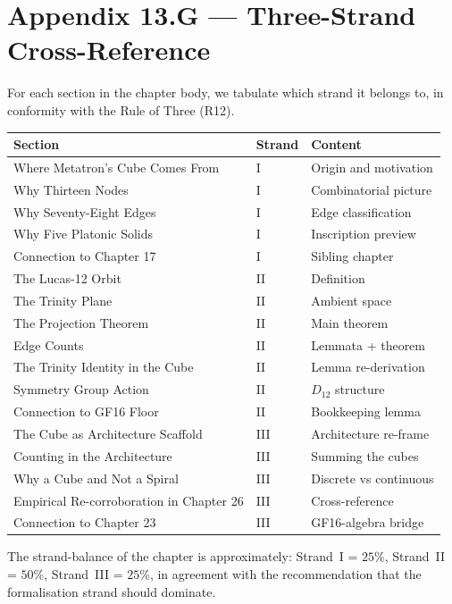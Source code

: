 \section*{Appendix 13.G --- Three-Strand Cross-Reference}
\label{fa_13:sec:13-appG}

For each section in the chapter body, we tabulate which strand it
belongs to, in conformity with the Rule of Three (R12).

\begin{center}
\begin{tabular}{lll}
Section & Strand & Content \\\hline
Where Metatron's Cube Comes From & I & Origin and motivation \\
Why Thirteen Nodes & I & Combinatorial picture \\
Why Seventy-Eight Edges & I & Edge classification \\
Why Five Platonic Solids & I & Inscription preview \\
Connection to Chapter 17 & I & Sibling chapter \\
The Lucas-12 Orbit & II & Definition \\
The Trinity Plane & II & Ambient space \\
The Projection Theorem & II & Main theorem \\
Edge Counts & II & Lemmata + theorem \\
The Trinity Identity in the Cube & II & Lemma re-derivation \\
Symmetry Group Action & II & $D_{12}$ structure \\
Connection to GF16 Floor & II & Bookkeeping lemma \\
The Cube as Architecture Scaffold & III & Architecture re-frame \\
Counting in the Architecture & III & Summing the cubes \\
Why a Cube and Not a Spiral & III & Discrete vs continuous \\
Empirical Re-corroboration in Chapter 26 & III & Cross-reference \\
Connection to Chapter 23 & III & GF16-algebra bridge \\
\end{tabular}
\end{center}

The strand-balance of the chapter is approximately:
Strand~I = $25\%$, Strand~II = $50\%$, Strand~III = $25\%$, in
agreement with the recommendation that the formalisation strand
should dominate.

